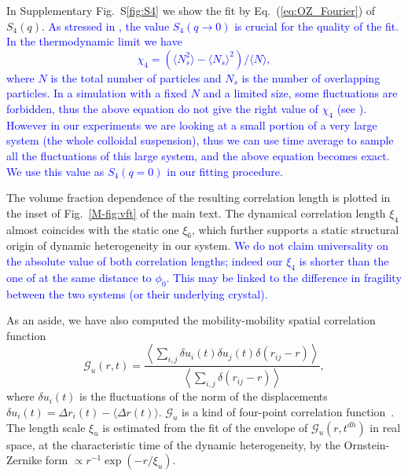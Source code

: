 \documentclass[prl,twocolumn,notitlepage]{revtex4-1}
\begin{document}
In Supplementary Fig.~S\ref{fig:S4} we show the fit by Eq.~(\ref{eq:OZ_Fourier}) of $S_4(q)$. \textcolor{blue}{As stressed in \citep{Flenner2011}, the value $S_4(q\rightarrow 0)$ is crucial for the quality of the fit. In the thermodynamic limit we have
\begin{equation}
\chi_4 = (\langle N_s^2\rangle - \langle N_s\rangle^2) /  \langle N\rangle,
\end{equation}
where $N$ is the total number of particles and $N_s$ is the number of overlapping particles. In a simulation with a fixed $N$ and a limited size, some fluctuations are forbidden, thus the above equation do not give the right value of $\chi_4$ (see \citep{Flenner2011}). However in our experiments we are looking at a small portion of a very large system (the whole colloidal suspension), thus we can use time average to sample all the fluctuations of this large system, and the above equation becomes exact. We use this value as $S_4(q=0)$ in our fitting procedure.} 

The volume fraction dependence of the resulting correlation length is plotted in the inset of Fig.~\ref{M-fig:vft} of the main text. The dynamical correlation length $\xi_4$ almost coincides with the static one $\xi_6$, which further supports a static structural origin of dynamic heterogeneity in our system. \textcolor{blue}{We do not claim universality on the absolute value of both correlation lengths; indeed our $\xi_4$ is shorter than the one of \citet{Flenner2011} at the same distance to $\phi_0$. This may be linked to the difference in fragility between the two systems (or their underlying crystal).}

As an aside, we have also computed the mobility-mobility spatial correlation function~\cite{Donati1999}
\begin{equation}
	\mathcal{G}_u(r,t) = \frac{
		\left\langle \sum_{i,j}{\delta u_i(t) \delta u_j(t) \delta(r_{ij} -r)} \right\rangle 
	}{
		\left\langle \sum_{i,j}{\delta(r_{ij} -r)} \right\rangle
	},
	\label{eq:mobility_correl}
\end{equation}
where $\delta u_i(t)$ is the fluctuations of the norm of the displacements $\delta u_i(t) = \Delta r_i(t)-\langle\Delta r(t)\rangle$. $\mathcal{G}_u$ is a kind of four-point correlation function~\cite{cavagna2009supercooled}. The length scale $\xi_u$ is estimated from the fit of the envelope of $\mathcal{G}_u(r,t^{dh})$ in real space, at the characteristic time of the dynamic heterogeneity, by the Ornstein-Zernike form $\propto r^{-1}\exp( -r/\xi_u)$. 
\end{document}
